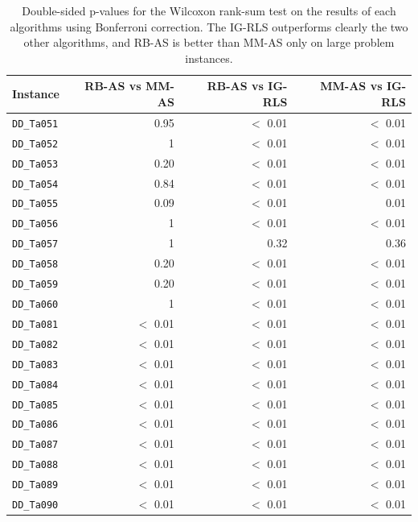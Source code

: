 \documentclass[runningheads]{llncs}
\begin{document}
\begin{table}
	\centering
	\begin{tabular}{lrrr}
		\toprule
		Instance & RB-AS vs MM-AS & RB-AS vs IG-RLS & MM-AS vs IG-RLS \\
		\midrule
		\texttt{DD\_Ta051} & 0.95     & $<$ 0.01 & $<$ 0.01 \\
		\texttt{DD\_Ta052} & 1        & $<$ 0.01 & $<$ 0.01 \\
		\texttt{DD\_Ta053} & 0.20     & $<$ 0.01 & $<$ 0.01 \\
		\texttt{DD\_Ta054} & 0.84     & $<$ 0.01 & $<$ 0.01 \\
		\texttt{DD\_Ta055} & 0.09     & $<$ 0.01 &     0.01 \\
		\texttt{DD\_Ta056} & 1        & $<$ 0.01 & $<$ 0.01 \\
		\texttt{DD\_Ta057} & 1        & 0.32     & 0.36     \\
		\texttt{DD\_Ta058} & 0.20     & $<$ 0.01 & $<$ 0.01 \\
		\texttt{DD\_Ta059} & 0.20     & $<$ 0.01 & $<$ 0.01 \\
		\texttt{DD\_Ta060} & 1        & $<$ 0.01 & $<$ 0.01 \\
		\texttt{DD\_Ta081} & $<$ 0.01 & $<$ 0.01 & $<$ 0.01 \\
		\texttt{DD\_Ta082} & $<$ 0.01 & $<$ 0.01 & $<$ 0.01 \\
		\texttt{DD\_Ta083} & $<$ 0.01 & $<$ 0.01 & $<$ 0.01 \\
		\texttt{DD\_Ta084} & $<$ 0.01 & $<$ 0.01 & $<$ 0.01 \\
		\texttt{DD\_Ta085} & $<$ 0.01 & $<$ 0.01 & $<$ 0.01 \\
		\texttt{DD\_Ta086} & $<$ 0.01 & $<$ 0.01 & $<$ 0.01 \\
		\texttt{DD\_Ta087} & $<$ 0.01 & $<$ 0.01 & $<$ 0.01 \\
		\texttt{DD\_Ta088} & $<$ 0.01 & $<$ 0.01 & $<$ 0.01 \\
		\texttt{DD\_Ta089} & $<$ 0.01 & $<$ 0.01 & $<$ 0.01 \\
		\texttt{DD\_Ta090} & $<$ 0.01 & $<$ 0.01 & $<$ 0.01 \\
		\bottomrule
	\end{tabular}
	\caption{Double-sided p-values for the Wilcoxon rank-sum test on the results
	of each algorithms using Bonferroni correction. The IG-RLS outperforms
	clearly the two other algorithms, and RB-AS is better than MM-AS only on large
	problem instances.}
\end{table}
\end{document}
